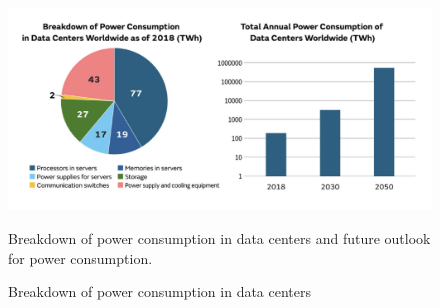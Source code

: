 \begin{figure}[H]
    \centering
    \includegraphics{fig/01/01-motivation.pdf}
    \caption{Breakdown of power consumption in data centers}
    \label{fig:01-motivation}
    \tiny
    Breakdown of power consumption in data centers and future outlook for power consumption.
\end{figure}


